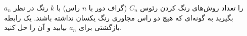\EXERCISE
$a_n$
را تعداد روش‌های رنگ کردن رئوس
$C_n$
(گراف دور با
$n$
راس) با
$k$
رنگ در نظر بگیرید به گونه‌ای که هیچ دو راس مجاوری رنگ یکسان نداشته باشند. یک رابطه بازگشتی برای
$a_n$
بیابید و آن را حل کنید.